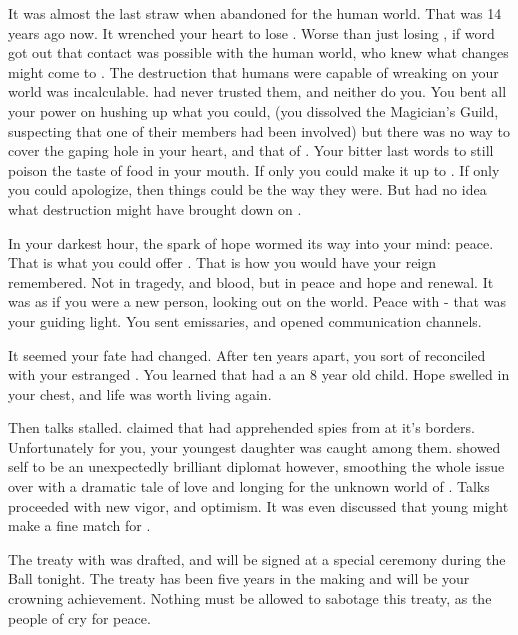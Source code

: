\documentclass[char]{NeptuneBall}
\begin{document}
It was almost the last straw when \cAriel{\Prince} \cAriel{} abandoned \pAtlantis{} for the human world. That was 14 years ago now.  It wrenched your heart to lose \cAriel{\them{}}. Worse than just losing \cAriel{\them}, if word got out that contact was possible with the human world, who knew what changes might come to \pAtlantis{}. The destruction that humans were capable of wreaking on your world was incalculable. \cExKing{\King} \cExKing{} had never trusted them, and neither do you. You bent all your power on hushing up what you could, (you dissolved the Magician's Guild, suspecting that one of their members had been involved) but there was no way to cover the gaping hole in your heart, and that of \pAtlantis{}. Your bitter last words to \cAriel{\Prince{}} \cAriel{\MYname{}} still poison the taste of food in your mouth. If only you could make it up to \cAriel{\them}. If only you could apologize, then things could be the way they were. But \cAriel{\they{}} had no idea what destruction \cAriel{\they{}} might have brought down on \pAtlantis{}.

In your darkest hour, the spark of hope wormed its way into your mind: peace. That is what you could offer \pAtlantis{}. That is how you would have your reign remembered. Not in tragedy, and blood, but in peace and hope and renewal. It was as if you were a new person, looking out on the world. Peace with \pPacifica{} - that was your guiding light. You sent emissaries, and opened communication channels. 

It seemed your fate had changed. After ten years apart, you sort of reconciled with your estranged \cAriel{\offspring} \cAriel{}.  You learned that \cAriel{} had a an 8 year old child. Hope swelled in your chest, and life was worth living again.  

Then talks stalled. \pPacifica{} claimed that had apprehended spies from \pAtlantis{} at it's borders. Unfortunately for you, your youngest daughter \cPrincess{} was caught among them. \cPrincess{\They} showed \cPrincess{\them}self to be an unexpectedly brilliant diplomat however, smoothing the whole issue over with a dramatic tale of love and longing for the unknown world of \pPacifica{}. Talks proceeded with new vigor, and optimism. It was even discussed that young \cPrince{\prince} \cPrince{} might make a fine match for \cPrincess{}.

The treaty with \pPacifica{} was drafted, and will be signed at a special ceremony during the Ball tonight. The treaty has been five years in the making and will be your crowning achievement. Nothing must be allowed to sabotage this treaty, as the people of \pAtlantis{} cry for peace.
\end{document}
